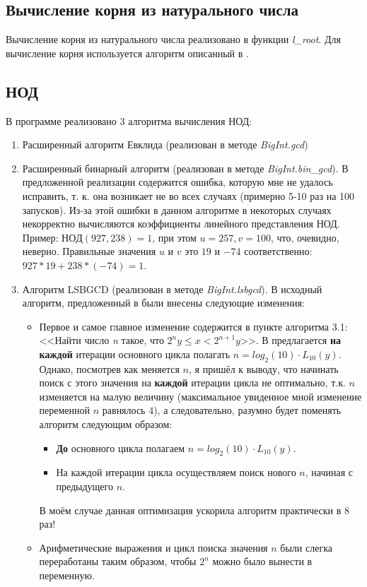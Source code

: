 \subsection{Вычисление корня из натурального числа}
Вычисление корня из натурального числа реализовано в функции \textit{l\_root}. Для вычисление корня используется алгоритм описанный в \cite{zavg}.

\subsection{НОД}
В программе реализовано 3 алгоритма вычисления НОД:

\begin{enumerate}
    \item Расширенный алгоритм Евклида \cite{zavg} (реализован в методе \textit{BigInt.gcd})
    \item Расширенный бинарный алгоритм \cite{zavg} (реализован в методе \textit{BigInt.bin\_gcd}).
    В предложенной реализации содержится ошибка, которую мне не удалось исправить, т. к. она возникает не во всех случаях (примерно 5-10 раз на 100 запусков).
    Из-за этой ошибки в данном алгоритме в некоторых случаях некорректно вычисляются коэффициенты линейного представления НОД.
    Пример: $НОД(927, 238) = 1$, при этом $u = 257, v = 100$, что, очевидно, неверно. Правильные значения $u$ и $v$ это $19$ и $-74$ соответственно: $927 * 19 + 238 * (-74) = 1$.
    \item Алгоритм LSBGCD \cite{zavg} (реализован в методе \textit{BigInt.lsbgcd}). В исходный алгоритм, предложенный в \cite{zavg} были внесены следующие изменения:
    \begin{itemize}
        \item Первое и самое главное изменение содержится в пункте алгоритма 3.1: <<Найти число \textit{n} такое, что $2^n y \leq x < 2^{n+1}y$>>.
        В \cite{zavg} предлагается \textbf{на каждой} итерации основного цикла полагать $n = log_2(10) \cdot L_{10}(y)$. Однако, посмотрев как меняется $n$, я пришёл к выводу, что начинать
        поиск с этого значения на \textbf{каждой} итерации цикла не оптимально, т.к. $n$ изменяется на малую величину (максимальное увиденное мной изменение переменной $n$ равнялось $4$),
        а следовательно, разумно будет поменять алгоритм следующим образом:
        \begin{itemize}
                \item \textbf{До} основного цикла полагаем $n = log_2(10) \cdot L_{10}(y)$.
                \item На каждой итерации цикла осуществляем поиск нового $n$, начиная с предыдущего $n$.
        \end{itemize}
        В моём случае данная оптимизация ускорила алгоритм практически в 8 раз!
        \item Арифметические выражения и цикл поиска значения $n$ были слегка переработаны таким образом, чтобы $2^n$ можно было вынести в переменную.
    \end{itemize}
\end{enumerate}

